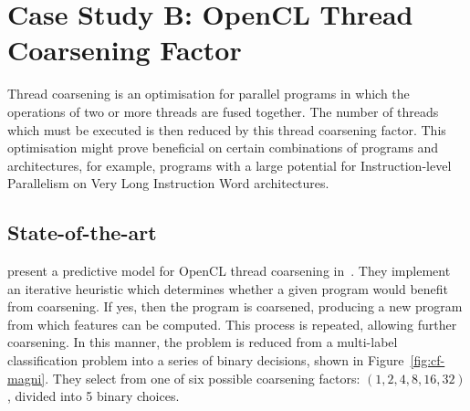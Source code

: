 \section{Case Study B: OpenCL Thread Coarsening Factor}
\label{sec:deeptune-case-study-b}

Thread coarsening is an optimisation for parallel programs in which the operations of two or more threads are fused together. The number of threads which must be executed is then reduced by this thread coarsening factor. This optimisation might prove beneficial on certain combinations of programs and architectures, for example, programs with a large potential for Instruction-level Parallelism on Very Long Instruction Word architectures.

\subsection{State-of-the-art} \citeauthor{Magni2014} present a predictive model for OpenCL thread coarsening in~\cite{Magni2014}. They implement an iterative heuristic which determines whether a given program would benefit from coarsening. If yes, then the program is coarsened, producing a new program from which features can be computed. This process is repeated, allowing further coarsening. In this manner, the problem is reduced from a multi-label classification problem into a series of binary decisions, shown in Figure~\ref{fig:cf-magni}. They select from one of six possible coarsening factors: $(1, 2, 4, 8, 16, 32)$, divided into 5 binary choices.

